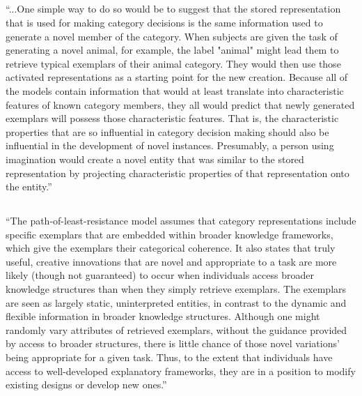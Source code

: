 \documentclass[12pt]{article}
\begin{document}
\subsection{\cite{ward1994structured}}
\begin{displayquote}
``...One simple way to do so would be to suggest that the stored representation that is used for making category decisions is the same information used to generate a novel member of the category. When subjects are given the task of generating a novel animal, for example, the label "animal" might lead them to retrieve typical exemplars of their animal category. They would then use those activated representations as a starting point for the new creation. Because all of the models contain information that would at least translate into characteristic features of known category members, they all would predict that newly generated exemplars will possess those characteristic features. That is, the characteristic properties that are so influential in category decision making should also be influential in the development of novel instances. Presumably, a person using imagination would create a novel entity that was similar to the stored representation by projecting characteristic properties of that representation onto the entity.''
\end{displayquote}


\subsection{\cite{ward1995s}}
\begin{displayquote}
``The path-of-least-resistance model assumes that category representations include specific exemplars that are embedded within broader knowledge frameworks, which give the exemplars their categorical coherence. It also states that truly useful, creative innovations that are novel and appropriate to a task are more likely (though not guaranteed) to occur when individuals access broader knowledge structures than when they simply retrieve exemplars. The exemplars are seen as largely static, uninterpreted entities, in contrast to the dynamic and flexible information in broader knowledge structures. Although one might randomly vary attributes of retrieved exemplars, without the guidance provided by access to broader structures, there is little chance of those novel variations' being appropriate for a given task. Thus, to the extent that individuals have access to well-developed explanatory frameworks, they are in a position to modify existing designs or develop new ones.''
\end{displayquote}
\end{document}
